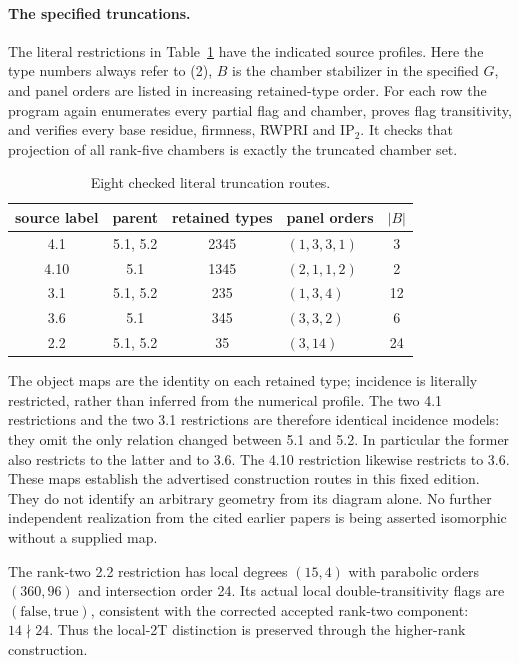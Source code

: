 \documentclass[11pt]{article}
\begin{document}
\paragraph{The specified truncations.}
The literal restrictions in Table~\ref{tab:trunc} have the indicated source
profiles. Here the type numbers always refer to (2), $B$ is the chamber
stabilizer in the specified $G$, and panel orders are listed in increasing
retained-type order. For each row the program again enumerates every partial
flag and chamber, proves flag transitivity, and verifies every base residue,
firmness, RWPRI and $\mathrm{IP}_2$. It checks that projection of all
rank-five chambers is exactly the truncated chamber set.

\begin{table}[h]\centering
\begin{tabular}{ccclc}\toprule
source label&parent&retained types&panel orders&$|B|$\\\midrule
4.1&5.1, 5.2&2345&$(1,3,3,1)$&3\\
4.10&5.1&1345&$(2,1,1,2)$&2\\
3.1&5.1, 5.2&235&$(1,3,4)$&12\\
3.6&5.1&345&$(3,3,2)$&6\\
2.2&5.1, 5.2&35&$(3,14)$&24\\\bottomrule
\end{tabular}
\caption{Eight checked literal truncation routes.}\label{tab:trunc}
\end{table}

The object maps are the identity on each retained type; incidence is
literally restricted, rather than inferred from the numerical profile.
The two 4.1 restrictions and the two 3.1 restrictions are therefore
identical incidence models: they omit the only relation changed between
5.1 and 5.2. In particular the former also restricts to the latter and to
3.6. The 4.10 restriction likewise restricts to 3.6. These maps establish
the advertised construction routes in this fixed edition. They do not
identify an arbitrary geometry from its diagram alone. No further
independent realization from the cited earlier papers is being asserted
isomorphic without a supplied map.

The rank-two 2.2 restriction has local degrees $(15,4)$ with parabolic
orders $(360,96)$ and intersection order 24. Its actual local
double-transitivity flags are $(\mathrm{false},\mathrm{true})$, consistent
with the corrected accepted rank-two component: $14\nmid24$. Thus the
local-2T distinction is preserved through the higher-rank construction.
\end{document}
